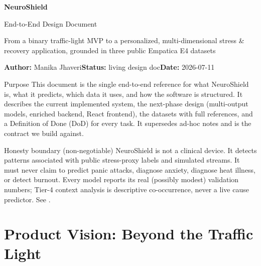 \documentclass[11pt,a4paper]{article}
\newcommand{\code}{\path}
\begin{document}
\thispagestyle{empty}

\begin{tcolorbox}[colback=nsblue,colframe=nsblue,arc=3pt,boxrule=0pt,
  left=16pt,right=16pt,top=16pt,bottom=16pt]
{\sffamily\color{white}\fontsize{27}{31}\selectfont\bfseries NeuroShield}\par
\vspace{4pt}
{\sffamily\color{white}\LARGE End-to-End Design Document}\par
\vspace{8pt}
{\sffamily\color{white!90}\large From a binary traffic-light MVP to a personalized, multi-dimensional
stress \& recovery application, grounded in three public Empatica E4 datasets}
\end{tcolorbox}

\vspace{8pt}
\textbf{Author:} Manika Jhaveri\hfill\textbf{Status:} living design doc\hfill\textbf{Date:} 2026-07-11

\begin{plainbox}{Purpose}
This document is the single end-to-end reference for what NeuroShield is, what it predicts, which
data it uses, and how the software is structured. It describes the current implemented system, the
next-phase design (multi-output models, enriched backend, React frontend), the datasets with full
references, and a Definition of Done (DoD) for every task. It supersedes ad-hoc notes and is the
contract we build against.
\end{plainbox}

\begin{warningbox}{Honesty boundary (non-negotiable)}
NeuroShield is not a clinical device. It detects patterns associated with public stress-proxy
labels and simulated streams. It must never claim to predict panic attacks, diagnose anxiety,
diagnose heat illness, or detect burnout. Every model reports its real (possibly modest)
validation numbers; Tier-4 context analysis is descriptive co-occurrence, never a live cause
predictor. See \code{docs/no_clinical_claims.md}.
\end{warningbox}

\tableofcontents
\newpage

\section{Product Vision: Beyond the Traffic Light}
\end{document}
